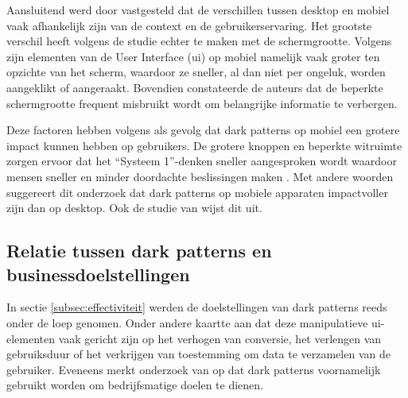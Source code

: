 \vspace{1em}

Aansluitend werd door \textcite{Nygren2024} vastgesteld dat de verschillen tussen desktop en mobiel vaak afhankelijk zijn van de context en de gebruikerservaring. Het grootste verschil heeft volgens de studie echter te maken met de schermgrootte. Volgens \textcite{Nygren2024} zijn elementen van de User Interface (\acrshort{ui}) op mobiel namelijk vaak groter ten opzichte van het scherm, waardoor ze sneller, al dan niet per ongeluk, worden aangeklikt of aangeraakt. Bovendien constateerde de auteurs dat de beperkte schermgrootte frequent misbruikt wordt om belangrijke informatie te verbergen. 

\vspace{1em}

Deze factoren hebben volgens \textcite{Nygren2024} als gevolg dat dark patterns op mobiel een grotere impact kunnen hebben op gebruikers. De grotere knoppen en beperkte witruimte zorgen ervoor dat het “Systeem 1”-denken sneller aangesproken wordt waardoor mensen sneller en minder doordachte beslissingen maken \autocite{Nygren2024}. Met andere woorden suggereert dit onderzoek dat dark patterns op mobiele apparaten impactvoller zijn dan op desktop. Ook de studie van \textcite{OECD2022} wijst dit uit.

\vspace{1em}

\subsection{Relatie tussen dark patterns en businessdoelstellingen}
\label{subsec:relatie-business}

\vspace{1em}

In sectie \ref{subsec:effectiviteit} werden de doelstellingen van dark patterns reeds onder de loep genomen. Onder andere \textcite{OECD2022} kaartte aan dat deze manipulatieve \acrshort{ui}-elementen vaak gericht zijn op het verhogen van conversie, het verlengen van gebruiksduur of het verkrijgen van toestemming om data te verzamelen van de gebruiker. Eveneens merkt onderzoek van \textcite{Kitkowska2023} op dat dark patterns voornamelijk gebruikt worden om bedrijfsmatige doelen te dienen.

\vspace{1em}

